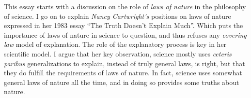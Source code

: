 This essay starts with a discussion on the role
of \emph{laws of nature} in the philosophy
of science.
I go on to explain \emph{Nancy Cartwright's}
positions on laws of nature expressed in her
1983 essay \enquote{The Truth Doesn't Explain Much}.
Which puts the importance of
laws of nature in science to question,
and thus refuses any \emph{covering law} model
of explanation.
The role of the explanatory process is
key in her scientific model.
I argue that her key observation,
science mostly uses
\emph{ceteris paribus} generalizations to explain, instead of truly general laws, is right,
but that they do fulfill the requirements of laws of nature.
In fact, science uses somewhat general laws of nature all the time,
and in doing so provides some truths about nature.
